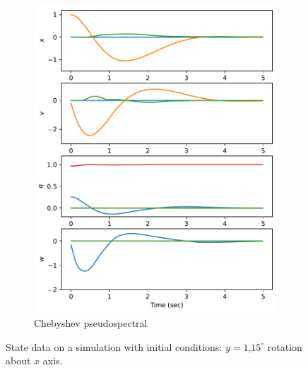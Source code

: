 \documentclass[]{article}
\begin{document}
\begin{figure}[H]
\begin{subfigure}[b]{0.3\textwidth}
		\includegraphics[width=\textwidth]{figures/statey115dx2.pdf}
		\caption{Chebyshev pseudospectral}
	\end{subfigure}
	\caption{State data on a simulation with initial conditions: $y = 1$,$15^{\circ}$ rotation about $x$ axis.}
	\label{fig:statey115dx}
\end{figure}
\end{document}
